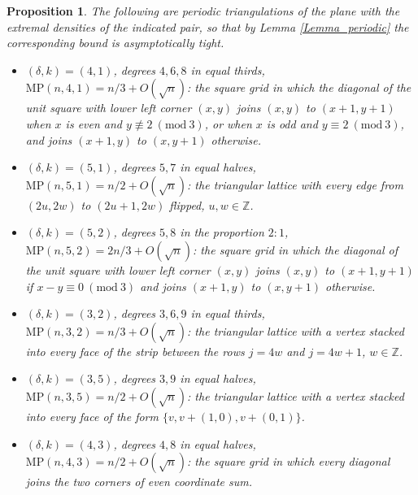 \documentclass[10pt,a4paper]{article}
\newtheorem{proposition}[theorem]{Proposition}
\begin{document}
\begin{proposition}
\label{Prop_hand}The following are periodic triangulations of the plane with the extremal densities of the indicated
pair, so that by Lemma \ref{Lemma_periodic} the corresponding bound is asymptotically tight.

\begin{itemize}
\item[\textrm{(a)}] $(\delta ,k)=(4,1)$, degrees $4,6,8$ in equal thirds, $\mathrm{MP}(n,4,1)=n/3+O(\sqrt{n})$:
the square grid in which the diagonal of the unit square with lower left corner $(x,y)$ joins $(x,y)$ to $(x+1,y+1)$
when $x$ is even and $y\not \equiv 2\ (\mathrm{mod}\ 3)$, or when $x$ is odd and $y\equiv 2\ (\mathrm{mod}\ 3)$, and
joins $(x+1,y)$ to $(x,y+1)$ otherwise.

\item[\textrm{(b)}] $(\delta ,k)=(5,1)$, degrees $5,7$ in equal halves, $\mathrm{MP}(n,5,1)=n/2+O(\sqrt{n})$:
the triangular lattice with every edge from $(2u,2w)$ to $(2u+1,2w)$ flipped, $u,w\in \mathbb{Z}$.

\item[\textrm{(c)}] $(\delta ,k)=(5,2)$, degrees $5,8$ in the proportion $2{:}1$, $\mathrm{MP}(n,5,2)=2n/3+O(\sqrt{n})$:
the square grid in which the diagonal of the unit square with lower left corner $(x,y)$ joins $(x,y)$ to $(x+1,y+1)$ if
$x-y\equiv 0\ (\mathrm{mod}\ 3)$ and joins $(x+1,y)$ to $(x,y+1)$ otherwise.

\item[\textrm{(d)}] $(\delta ,k)=(3,2)$, degrees $3,6,9$ in equal thirds, $\mathrm{MP}(n,3,2)=n/3+O(\sqrt{n})$: the
triangular lattice with a vertex stacked into every face of the strip between the rows $j=4w$ and $j=4w+1$, $w\in
\mathbb{Z}$.

\item[\textrm{(e)}] $(\delta ,k)=(3,5)$, degrees $3,9$ in equal halves, $\mathrm{MP}(n,3,5)=n/2+O(\sqrt{n})$: the
triangular lattice with a vertex stacked into every face of the form $\{v,v+(1,0),v+(0,1)\}$.

\item[\textrm{(f)}] $(\delta ,k)=(4,3)$, degrees $4,8$ in equal halves, $\mathrm{MP}(n,4,3)=n/2+O(\sqrt{n})$: the
square grid in which every diagonal joins the two corners of even coordinate sum.
\end{itemize}
\end{proposition}
\end{document}
